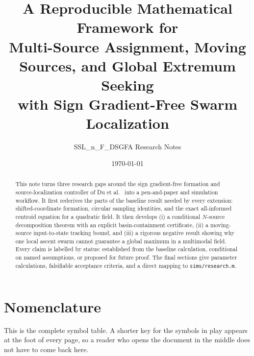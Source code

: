 \documentclass[11pt]{article}
\title{A Reproducible Mathematical Framework for\\
Multi-Source Assignment, Moving Sources, and Global Extremum Seeking\\
with Sign Gradient-Free Swarm Localization}
\author{SSL\_n\_F\_DSGFA Research Notes}
\date{\today}
\begin{document}
\maketitle

\begin{abstract}
This note turns three research gaps around the sign gradient-free formation and source-localization controller of Du et al.\ \cite{du2024} into a pen-and-paper and simulation workflow. It first rederives the parts of the baseline result needed by every extension: shifted-coordinate formation, circular sampling identities, and the exact all-informed centroid equation for a quadratic field. It then develops (i) a conditional $N$-source decomposition theorem with an explicit basin-containment certificate, (ii) a moving-source input-to-state tracking bound, and (iii) a rigorous negative result showing why one local ascent swarm cannot guarantee a global maximum in a multimodal field. Every claim is labelled by status: established from the baseline calculation, conditional on named assumptions, or proposed for future proof. The final sections give parameter calculations, falsifiable acceptance criteria, and a direct mapping to \texttt{sims/research.m}.
\end{abstract}

\tableofcontents

\newpage
\section*{Nomenclature}\label{sec:nomenclature}

This is the complete symbol table. A shorter key for the symbols in play appears at the foot of every page, so a reader who opens the document in the middle does not have to come back here.
\end{document}
